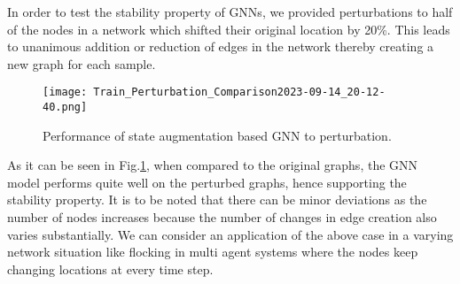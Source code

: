 \documentclass[lettersize,journal]{IEEEtran}
\begin{document}
In order to test the stability property of GNNs, we provided perturbations to half of the nodes in a network which shifted their original location by 20\%. This leads to unanimous addition or reduction of edges in the network thereby creating a new graph for each sample. 
\begin{figure}[h]%
    \centering   
    \texttt{[image: Train\_Perturbation\_Comparison2023-09-14\_20-12-40.png]}
    \caption{Performance of state augmentation based GNN to perturbation.}
    \label{Fig:perturb}
\end{figure}
As it can be seen in Fig.\ref{Fig:perturb}, when compared to the original graphs, the GNN model performs quite well on the perturbed graphs, hence supporting the stability property. It is to be noted that there can be minor deviations as the number of nodes increases because the number of changes in edge creation also varies substantially. We can consider an application of the above case in a varying network situation like flocking in multi agent systems where the nodes keep changing locations at every time step.
\end{document}
